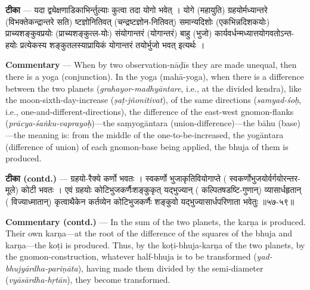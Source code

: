 \documentclass[11pt,a4paper]{article}
\newcommand{\skt}[1]{{\devanagarifont\color{sktcolor} #1}}
\newenvironment{bilingual}{%
  \par\noindent
  \begin{minipage}[t]{0.47\textwidth}%
}{%
  \par\end{minipage}%
}
\newcommand{\rightcol}{%
  \par\end{minipage}%
  \hfill
  \begin{minipage}[t]{0.47\textwidth}%
}
\begin{document}
\medskip

\begin{bilingual}
\textbf{टीका} --- \skt{यदा द्व्येक्षणाडिकाभिर्न्तुल्याः कुत्वा तदा योगो भवेत् । योगे} (महायुति) \skt{ग्रहयोर्मध्यान्तरे} (विभक्तेकन्द्रान्तरे सति) \skt{ष्टज्ञोनितिवत्} (चन्द्रष्टज्ञोन-नितिवत्) \skt{समान्यदिशोः} (एकभिन्नदिशकयोः) \skt{प्राच्यशङ्कुवप्रयोः} (प्राच्यशङ्कुत्ल-योः) \skt{संयोगान्तरं} (योगान्तरं) \skt{बाहु} (भुजो) \skt{कार्यवर्धन्मध्यात्तयोगवतोऽन्त-हयोः प्रत्येकस्य शङ्कुतलस्याप्रायिकं योगान्तरं तयोर्भुजो भवत् इत्यर्थः} ।
\rightcol
\textbf{Commentary} --- When by two observation-nāḍīs they are made unequal, then there is a yoga (conjunction). In the yoga (mahā-yoga), when there is a difference between the two planets (\textit{grahayor-madhyāntare}, i.e., at the divided kendra), like the moon-sixth-day-increase (\textit{ṣaṭ-jñonitivat}), of the same directions (\textit{samyad-śoḥ}, i.e., one-and-different-directions), the difference of the east-west gnomon-flanks (\textit{prācya-śaṅku-vaprayoḥ})---the saṃyogāntara (union-difference)---the bāhu (base)---the meaning is: from the middle of the one-to-be-increased, the yogāntara (difference of union) of each gnomon-base being applied, the bhuja of them is produced.
\end{bilingual}

\medskip

\begin{bilingual}
\textbf{टीका (contd.)} --- \skt{ग्रहयो-रैक्ये कर्णो भवतः । स्वकर्णो भुजाकृतिवियोगाप्ते} (\skt{स्वकर्णोभुजयोर्वर्गयोरन्तर-मूले}) \skt{कोटी भवतः । एवं ग्रहयोः कोटिभुजकर्णैःशङ्कुकृत् यद्भुज्यान्} (\skt{कल्पितषडष्टि-गुणान्}) \skt{व्यासार्धहृतान्} (\skt{विज्याध्मातान्}) \skt{कृत्वाथैकेन कर्तव्येन कोटिभुजकर्णैः शङ्कुवो यद्भुज्यासार्धपरिणाता भवेतुः} ॥५७-५९॥
\rightcol
\textbf{Commentary (contd.)} --- In the sum of the two planets, the karṇa is produced. Their own karṇa---at the root of the difference of the squares of the bhuja and karṇa---the koṭi is produced. Thus, by the koṭi-bhuja-karṇa of the two planets, by the gnomon-construction, whatever half-bhuja is to be transformed (\textit{yad-bhujyārdha-pariṇāta}), having made them divided by the semi-diameter (\textit{vyāsārdha-hṛtān}), they become transformed.
\end{bilingual}

\medskip
\end{document}
